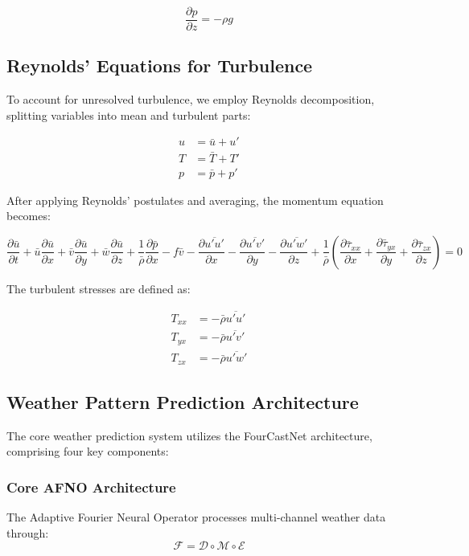 \documentclass{article}
\begin{document}
\begin{equation}
\frac{\partial p}{\partial z} = -\rho g
\end{equation}

\subsection{Reynolds' Equations for Turbulence}
To account for unresolved turbulence, we employ Reynolds decomposition, splitting variables into mean and turbulent parts:

\begin{align}
u &= \bar{u} + u' \\
T &= \bar{T} + T' \\
p &= \bar{p} + p'
\end{align}

After applying Reynolds' postulates and averaging, the momentum equation becomes:

\begin{equation}
\frac{\partial \bar{u}}{\partial t} + \bar{u}\frac{\partial \bar{u}}{\partial x} + \bar{v}\frac{\partial \bar{u}}{\partial y} + \bar{w}\frac{\partial \bar{u}}{\partial z} + \frac{1}{\bar{\rho}}\frac{\partial \bar{p}}{\partial x} - f\bar{v} - \frac{\partial \overline{u'u'}}{\partial x} - \frac{\partial \overline{u'v'}}{\partial y} - \frac{\partial \overline{u'w'}}{\partial z} + \frac{1}{\bar{\rho}}\left(\frac{\partial \bar{\tau}_{xx}}{\partial x} + \frac{\partial \bar{\tau}_{yx}}{\partial y} + \frac{\partial \bar{\tau}_{zx}}{\partial z}\right) = 0
\end{equation}

The turbulent stresses are defined as:

\begin{align}
T_{xx} &= -\bar{\rho}\overline{u'u'} \\
T_{yx} &= -\bar{\rho}\overline{u'v'} \\
T_{zx} &= -\bar{\rho}\overline{u'w'}
\end{align}

\subsection{Weather Pattern Prediction Architecture}

The core weather prediction system utilizes the FourCastNet architecture, comprising four key components:

\subsubsection{Core AFNO Architecture}
The Adaptive Fourier Neural Operator processes multi-channel weather data through:
\begin{equation}
\mathcal{F} = \mathcal{D} \circ \mathcal{M} \circ \mathcal{E}
\end{equation}
\end{document}
